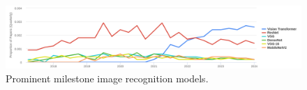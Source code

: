 \begin{figure}[H]
    \centering
    \includegraphics[width=\textwidth]{fig/rel/images/vit_impact.png}
    \caption{Prominent milestone image recognition models.}
    \label{fig:rel_prominent}
\end{figure}
